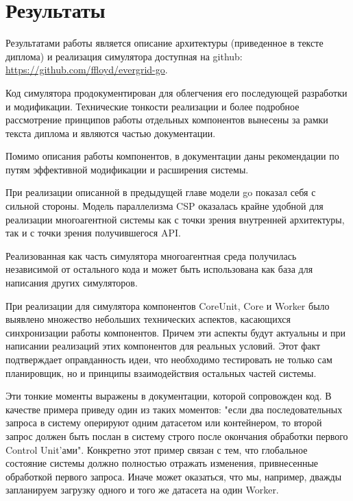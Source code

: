 \chapter{Результаты}

Результатами работы является описание архитектуры (приведенное в тексте диплома) и реализация симулятора доступная на github: \url{https://github.com/ffloyd/evergrid-go}.

Код симулятора продокументирован для облегчения его последующей разработки и модификации. Технические тонкости реализации и более подробное рассмотрение принципов работы отдельных компонентов вынесены за рамки текста диплома и являются частью документации.

Помимо описания работы компонентов, в документации даны рекомендации по путям эффективной модификации и расширения системы.

При реализации описанной в предыдущей главе модели go показал себя с сильной стороны. Модель параллелизма CSP оказалась крайне удобной для реализации многоагентной системы как с точки зрения внутренней архитектуры, так и с точки зрения получившегося API.

Реализованная как часть симулятора многоагентная среда получилась независимой от остального кода и может быть использована как база для написания других симуляторов.

При реализации для симулятора компонентов CoreUnit, Core и Worker было выявлено множество небольших технических аспектов, касающихся синхронизации работы компонентов. Причем эти аспекты будут актуальны и при написании реализаций этих компонентов для реальных условий. Этот факт подтверждает оправданность идеи, что необходимо тестировать не только сам планировщик, но и принципы взаимодействия остальных частей системы.

Эти тонкие моменты выражены в документации, которой сопровожден код. В качестве примера приведу один из таких моментов: "если два последовательных запроса в систему оперируют одним датасетом или контейнером, то второй запрос должен быть послан в систему строго после окончания обработки первого Control Unit'ами". Конкретно этот пример связан с тем, что глобальное состояние системы должно полностью отражать изменения, привнесенные обработкой первого запроса. Иначе может оказаться, что мы, например, дважды запланируем загрузку одного и того же датасета на один Worker.